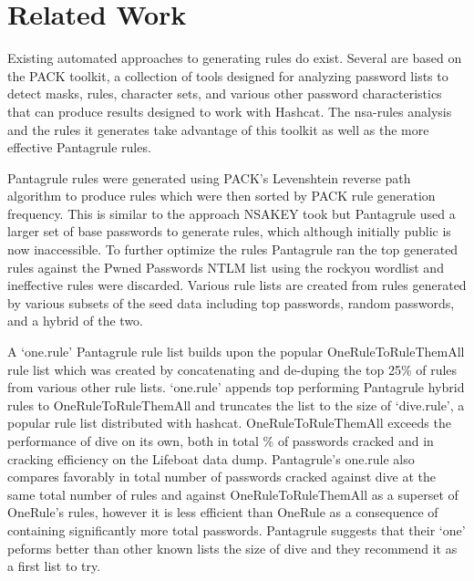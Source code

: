 \documentclass[letterpaper,twocolumn,10pt]{article}
\begin{document}



\section{Related Work}

Existing automated approaches to generating rules do exist. Several are based on the PACK toolkit,
a collection of tools designed for analyzing password lists to detect masks, rules, character sets,
and various other password characteristics that can produce results designed to work with Hashcat.
The nsa-rules analysis and the rules it generates take advantage of this toolkit as well as the more
effective Pantagrule rules.\cite{PACK}\cite{NSAKEY}\cite{pantagrule}

Pantagrule rules were generated using PACK's Levenshtein reverse path algorithm to produce rules which
were then sorted by PACK rule generation frequency. This is similar to the approach NSAKEY took but
Pantagrule used a larger set of base passwords to generate rules, which although initially public is
now inaccessible. To further optimize the rules Pantagrule ran the top generated rules against the
Pwned Passwords NTLM list using the rockyou wordlist and ineffective rules were discarded. Various
rule lists are created from rules generated by various subsets of the seed data including top passwords,
random passwords, and a hybrid of the two.

A `one.rule' Pantagrule rule list builds upon the popular
OneRuleToRuleThemAll rule list which was created by concatenating and de-duping the top 25\% of rules
from various other rule lists. `one.rule' appends top performing Pantagrule hybrid rules to OneRuleToRuleThemAll
and truncates the list to the size of `dive.rule', a popular rule list distributed with hashcat.
OneRuleToRuleThemAll exceeds the performance of dive on its own, both in total \% of passwords cracked and in
cracking efficiency on the Lifeboat data dump. Pantagrule's one.rule also compares favorably in total number of
passwords cracked against dive at the same total number of rules and against OneRuleToRuleThemAll as a superset
of OneRule's rules, however it is less efficient than OneRule as a consequence of containing significantly more
total passwords. Pantagrule suggests that their `one' peforms better than other known lists the size of dive
and they recommend it as a first list to try.
\end{document}
